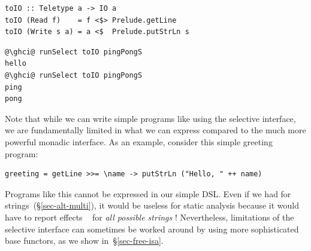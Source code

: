\vspace{1mm}
\begin{verbatim}
toIO :: Teletype a -> IO a
toIO (Read f)    = f <$> Prelude.getLine
toIO (Write s a) = a <$  Prelude.putStrLn s
\end{verbatim}
\vspace{1mm}
\begin{verbatim}
@\ghci@ runSelect toIO pingPongS
hello
@\ghci@ runSelect toIO pingPongS
ping
pong
\end{verbatim}
\vspace{1mm}

\noindent
Note that while we can write simple programs like  using the
selective interface, we are fundamentally limited in what we can express
compared to the much more powerful monadic interface. As an example, consider
this simple greeting program:

\vspace{1mm}
\begin{verbatim}
greeting = getLine >>= \name -> putStrLn ("Hello, " ++ name)
\end{verbatim}
\vspace{1mm}

\noindent
Programs like this cannot be expressed in our simple  DSL. Even if
we had  for strings~(\S\ref{sec-alt-multi}), it would be useless for
static analysis because it would have to report effects ~ for
\emph{all possible strings} ! Nevertheless, limitations of the
selective interface can sometimes be worked around by using more sophisticated
base functors, as we show in~\S\ref{sec-free-isa}.


